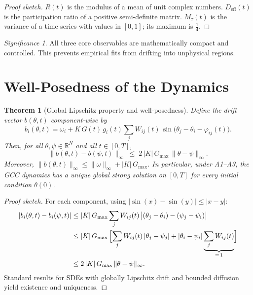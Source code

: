 \documentclass[11pt]{article}
\theoremstyle{plain}
\newtheorem{theorem}{Theorem}[section]
\theoremstyle{definition}
\theoremstyle{remark}
\newtheorem*{significance}{Significance}
\newcommand{\Deff}{D_{\mathrm{eff}}}
\newcommand{\Mtau}{M_{\tau}}
\newcommand{\Gmax}{G_{\max}}
\begin{document}
\begin{proof}[Proof sketch]
$R(t)$ is the modulus of a mean of unit complex numbers. $\Deff(t)$ is the participation ratio of a positive semi-definite matrix. $\Mtau(t)$ is the variance of a time series with values in $[0,1]$; its maximum is $\frac{1}{4}$.
\end{proof}

\begin{significance}
All three core observables are mathematically compact and controlled. This prevents empirical fits from drifting into unphysical regions.
\end{significance}


\section{Well-Posedness of the Dynamics}

\begin{theorem}[Global Lipschitz property and well-posedness]
\label{satz:lipschitz}
Define the drift vector $b(\theta,t)$ component-wise by
\begin{equation}
b_i(\theta,t) = \omega_i + K\,G(t)\,g_i(t)\sum_j W_{ij}(t)\,\sin\!\bigl(\theta_j - \theta_i - \varphi_{ij}(t)\bigr).
\end{equation}
Then, for all $\theta,\psi \in \mathbb{R}^N$ and all $t \in [0,T]$,
\begin{equation}
\label{eq:lipschitz}
\|b(\theta,t) - b(\psi,t)\|_{\infty} \;\leq\; 2\,|K|\,\Gmax\,\|\theta - \psi\|_{\infty}.
\end{equation}
Moreover, $\|b(\theta,t)\|_{\infty} \leq \|\omega\|_{\infty} + |K|\,\Gmax$. In particular, under \textup{A1--A3}, the GCC dynamics has a unique global strong solution on $[0,T]$ for every initial condition $\theta(0)$.
\end{theorem}

\begin{proof}[Proof sketch]
For each component, using $|\sin(x) - \sin(y)| \leq |x - y|$:
\begin{align}
|b_i(\theta,t) - b_i(\psi,t)|
&\leq |K|\,\Gmax \sum_j W_{ij}(t)\,\bigl|(\theta_j - \theta_i) - (\psi_j - \psi_i)\bigr| \notag\\
&\leq |K|\,\Gmax\,\Bigl[\sum_j W_{ij}(t)\,|\theta_j - \psi_j| + |\theta_i - \psi_i|\underbrace{\sum_j W_{ij}(t)}_{=\,1}\Bigr] \notag\\
&\leq 2\,|K|\,\Gmax\,\|\theta - \psi\|_{\infty}. \label{eq:lip_detail}
\end{align}
Standard results for SDEs with globally Lipschitz drift and bounded diffusion yield existence and uniqueness.
\end{proof}
\end{document}
